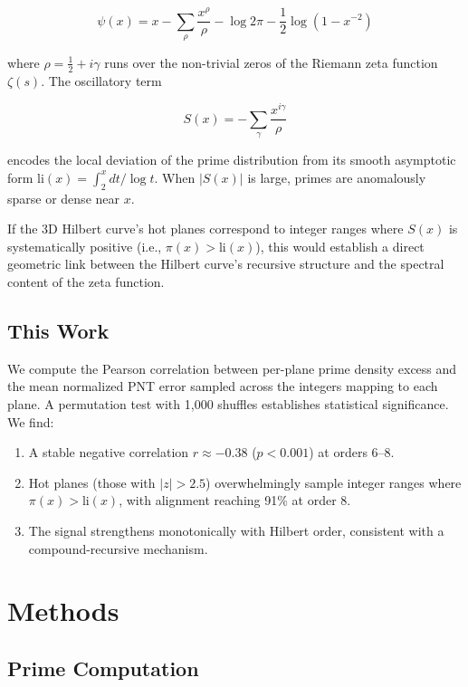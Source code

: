 \documentclass[11pt,a4paper]{article}
\begin{document}
\begin{equation}
\psi(x) = x - \sum_{\rho} \frac{x^{\rho}}{\rho} - \log 2\pi
- \frac{1}{2}\log(1 - x^{-2})
\label{eq:explicit}
\end{equation}

where $\rho = \frac{1}{2} + i\gamma$ runs over the non-trivial zeros of
the Riemann zeta function $\zeta(s)$. The oscillatory term

\begin{equation}
S(x) = -\sum_{\gamma} \frac{x^{i\gamma}}{\rho}
\label{eq:oscillatory}
\end{equation}

encodes the local deviation of the prime distribution from its smooth
asymptotic form $\text{li}(x) = \int_2^x dt/\log t$. When $|S(x)|$
is large, primes are anomalously sparse or dense near $x$.

If the 3D Hilbert curve's hot planes correspond to integer ranges where
$S(x)$ is systematically positive (i.e., $\pi(x) > \text{li}(x)$), this
would establish a direct geometric link between the Hilbert curve's
recursive structure and the spectral content of the zeta function.

\subsection{This Work}

We compute the Pearson correlation between per-plane prime density excess
and the mean normalized PNT error sampled across the integers mapping to
each plane. A permutation test with 1,000 shuffles establishes statistical
significance. We find:

\begin{enumerate}
\item A stable negative correlation $r \approx -0.38$ ($p < 0.001$) at
   orders 6--8.
\item Hot planes (those with $|z| > 2.5$) overwhelmingly sample integer
   ranges where $\pi(x) > \text{li}(x)$, with alignment reaching 91\%
   at order 8.
\item The signal strengthens monotonically with Hilbert order, consistent
   with a compound-recursive mechanism.
\end{enumerate}

\section{Methods}

\subsection{Prime Computation}
\end{document}
